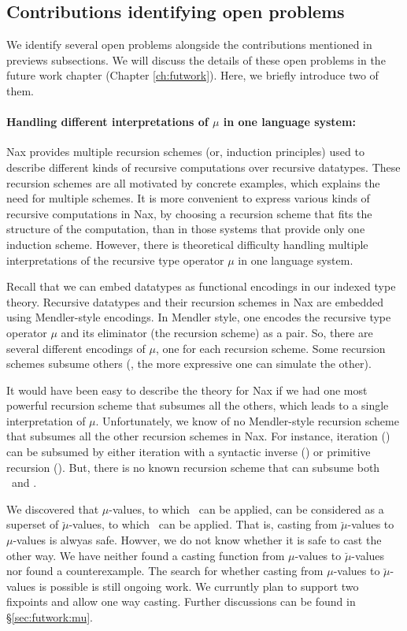 \subsection{Contributions identifying open problems}
We identify several open problems alongside the contributions mentioned
in previews subsections. We will discuss the details of these open problems
in the future work chapter (Chapter \ref{ch:futwork}).
Here, we briefly introduce two of them.

\paragraph{Handling different interpretations of $\mu$ in one language system:}
Nax provides multiple recursion schemes (or, induction principles) used
to describe different kinds of recursive computations over recursive datatypes.
These recursion schemes are all motivated by concrete examples, which explains
the need for multiple schemes. It is more convenient to express various kinds of
recursive computations in Nax, by choosing a recursion scheme that fits
the structure of the computation, than in those systems that provide
only one induction scheme. However, there is theoretical difficulty
handling multiple interpretations of the recursive type operator $\mu$
in one language system.

Recall that we can embed datatypes as functional encodings in
our indexed type theory. Recursive datatypes and their recursion schemes in Nax
are embedded using Mendler-style encodings.
In Mendler style, one encodes the recursive type operator $\mu$
and its eliminator (the recursion scheme) as a pair.
So, there are several different encodings of $\mu$,
one for each recursion scheme. Some recursion schemes subsume others
(\ie, the more expressive one can simulate the other).

It would have been easy to describe the theory for Nax if we had
one most powerful recursion scheme that subsumes all the others,
which leads to a single interpretation of $\mu$. Unfortunately, we know of
no Mendler-style recursion scheme that subsumes all the other recursion schemes
in Nax. For instance, iteration (\MIt) can be subsumed by either 
iteration with a syntactic inverse (\MsfIt) or primitive recursion (\MPr).
But, there is no known recursion scheme that can subsume both \MsfIt\ and \MPr.

We discovered that $\mu$-values, to which \MIt\ can be applied,
can be considered as a superset of $\breve\mu$-values,
to which \MsfIt\ can be applied. That is, casting from $\breve\mu$-values to
$\mu$-values is alwyas safe. Howver, we do not know whether it is safe to
cast the other way. We have neither found a casting function from
$\mu$-values to $\breve\mu$-values nor found a counterexample.
The search for whether casting from $\mu$-values to $\breve\mu$-values
is possible is still ongoing work. We curruntly plan to support two
fixpoints and allow one way casting. Further discussions can be found
in \S\ref{sec:futwork:mu}.

